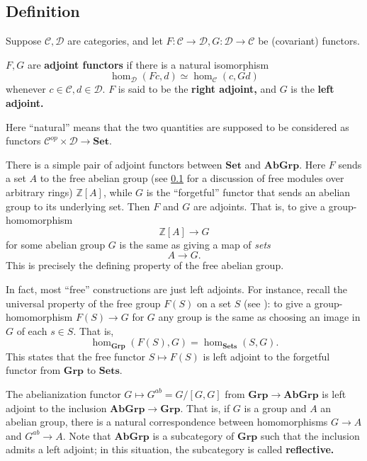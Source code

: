 \subsection{Definition}

Suppose $\mathcal{C}, \mathcal{D}$ are categories, and let $F: \mathcal{C} \to
\mathcal{D}, G: \mathcal{D} \to \mathcal{C}$ be (covariant) functors.

\begin{definition} 
$F, G$ are \textbf{adjoint functors} if there is a natural isomorphism
\[ \hom_{\mathcal{D}}(Fc, d) \simeq \hom_{\mathcal{C}}(c, Gd)  \]
whenever $c \in \mathcal{C}, d \in \mathcal{D}$. $F$ is said to be the
\textbf{right adjoint,} and $G$ is the \textbf{left adjoint.}
\end{definition} 

Here ``natural'' means that the two quantities are supposed to be considered
as functors $\mathcal{C}^{op} \times \mathcal{D} \to \mathbf{Set}$.

\begin{example} 
There is a simple pair of adjoint functors between $\mathbf{Set}$ and $\mathbf{AbGrp}$. Here
$F$ sends  a set $A$ to the free abelian group (see \cref{} for a discussion
of free modules over arbitrary rings) $\mathbb{Z}[A]$, while $G$ is
the ``forgetful'' functor that sends an abelian group to its underlying set. 
Then $F$ and $G$ are adjoints. That is, to give a group-homomorphism
\[ \mathbb{Z}[A] \to G  \]
for some abelian group $G$ 
is the same as giving a map of \emph{sets}
\[ A \to G.  \]
This is precisely the defining property of the free abelian group.
\end{example} 

\begin{example}
In fact, most ``free'' constructions are just left adjoints.
For instance, recall the universal property of the free group $F(S)$ on a set $S$ (see
\cite{La02}): to give a group-homomorphism $F(S) \to G$ for $G$ any group is
the same as choosing an image in $G$ of each $s \in S$.
That is,
\[ \hom_{\mathbf{Grp}}(F(S), G) = \hom_{\mathbf{Sets}}(S, G).  \]
This states that the free functor $S \mapsto F(S)$ is left adjoint to the
forgetful functor from $\mathbf{Grp}$ to $\mathbf{Sets}$.
\end{example}

\begin{example} 
The abelianization functor $G \mapsto G^{ab} = G/[G, G]$ from $\mathbf{Grp}
\to \mathbf{AbGrp}$ is left adjoint to the
inclusion $\mathbf{AbGrp} \to \mathbf{Grp}$.
That is, if $G$ is a group and $A$ an abelian group, there is  a natural
correspondence between homomorphisms $G \to A$ and $G^{ab} \to A$.
Note that $\mathbf{AbGrp}$ is a subcategory of $\mathbf{Grp}$ such that the
inclusion admits a left adjoint; in this situation, the subcategory is called
\textbf{reflective.}
\end{example} 




